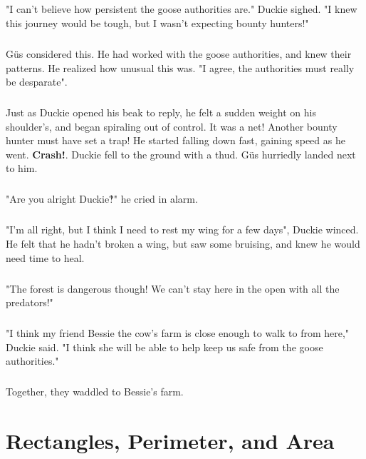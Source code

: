 \documentclass[a4paper,11pt ]{book}
\begin{document}
\paragraph{} "I can't believe how persistent the goose authorities are." Duckie sighed. "I knew this journey would be tough, but I wasn't expecting bounty hunters!"
\paragraph{} Güs considered this. He had worked with the goose authorities, and knew their patterns. He realized how unusual this was. "I agree, the authorities must really be desparate".
\paragraph{} Just as Duckie opened his beak to reply, he felt a sudden weight on his shoulder's, and began spiraling out of control. It was a net! Another bounty hunter must have set a trap! He started falling down fast, gaining speed as he went. \textbf{Crash!}. Duckie fell to the ground with a thud. Güs hurriedly landed next to him. 
\paragraph{} "Are you alright Duckie‽" he cried in alarm.
\paragraph{} "I'm all right, but I think I need to rest my wing for a few days", Duckie winced. He felt that he hadn't broken a wing, but saw some bruising, and knew he would need time to heal. 
 \paragraph{} "The forest is dangerous though! We can't stay here in the open with all the predators!"
 \paragraph{} "I think my friend Bessie the cow's farm is close enough to walk to from here," Duckie said. "I think she will be able to help keep us safe from the goose authorities."
 \paragraph{} Together, they waddled to Bessie's farm.
 \chapter{Rectangles, Perimeter, and Area}
\end{document}
